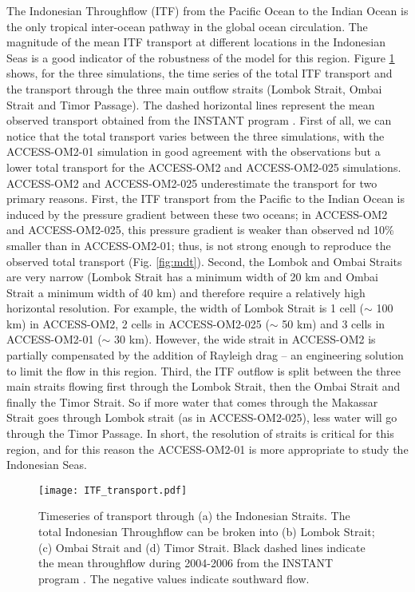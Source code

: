 \documentclass[gmd, manuscript]{copernicus}
\begin{document}
The Indonesian Throughflow (ITF) from the Pacific Ocean to the Indian Ocean is the only tropical inter-ocean pathway in the global ocean circulation.
The magnitude of the mean ITF transport at different locations in the Indonesian Seas is a good indicator of the robustness of the model for this region. Figure \ref{fig:ITF_transport} shows, for the three simulations, the time series of the total ITF transport and the transport through the three main outflow straits (Lombok Strait, Ombai Strait and Timor Passage).
The dashed horizontal lines represent the mean observed transport obtained from the INSTANT program \citep{Sprintall2009}. 
First of all, we can notice that the total transport varies between the three simulations, with the ACCESS-OM2-01 simulation in good agreement with the observations but a lower total transport for the ACCESS-OM2 and ACCESS-OM2-025 simulations. 
ACCESS-OM2 and ACCESS-OM2-025 underestimate the transport for two primary reasons.
First, the ITF transport from the Pacific to the Indian Ocean is induced by the pressure gradient between these two oceans; in ACCESS-OM2 and ACCESS-OM2-025, this pressure gradient is weaker than observed nd 10\% smaller than in ACCESS-OM2-01; thus, is not strong enough to reproduce the observed total transport (Fig. \ref{fig:mdt}).
Second, the Lombok and Ombai Straits are very narrow (Lombok Strait has a minimum width of 20 km and Ombai Strait a minimum width of 40 km) and therefore require a relatively high horizontal resolution.
For example, the width of Lombok Strait is 1 cell ($\sim$ 100 km) in ACCESS-OM2, 2 cells in ACCESS-OM2-025 ($\sim$ 50 km) and 3 cells in ACCESS-OM2-01 ($\sim$ 30 km).
However, the wide strait in ACCESS-OM2 is partially compensated by the addition of Rayleigh drag -- an engineering solution to limit the flow in this region. 
Third, the ITF outflow is split between the three main straits flowing first through the Lombok Strait, then the Ombai Strait and finally the Timor Strait.
So if more water that comes through the Makassar Strait goes through Lombok strait (as in ACCESS-OM2-025), less water will go through the Timor Passage. 
In short, the resolution of straits is critical for this region, and for this reason the ACCESS-OM2-01 is more appropriate to study the Indonesian Seas.

\begin{figure}[t]
\texttt{[image: ITF\_transport.pdf]}
\caption{
Timeseries of transport through (a) the Indonesian Straits. The total Indonesian Throughflow can be broken into (b) Lombok Strait; (c) Ombai Strait and (d) Timor Strait. Black dashed lines indicate the mean throughflow during 2004-2006 from the INSTANT program \citep{Sprintall2009}. The negative values indicate southward flow. \label{fig:ITF_transport}}
\end{figure}
\end{document}
